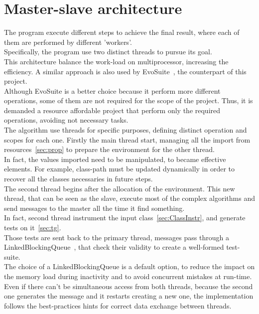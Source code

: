 \section{Master-slave architecture }\label{sec:MSArch}
The program execute different steps to achieve the final result, where each of them are performed by different 'workers'.\\
Specifically, the program use two distinct threads to pursue its goal.\\
This architecture balance the work-load on multiprocessor, increasing the efficiency.
A similar approach is also used by EvoSuite~\cite{evosuite}, the counterpart of this project.\\
Although EvoSuite is a better choice because it perform more different operations, some of them are not required for the scope of the project.
Thus, it is demanded a resource affordable project that perform only the required operations, avoiding not necessary tasks.\\
The algorithm use threads for specific purposes, defining distinct operation and scopes for each one.
Firstly the main thread start, managing all the import from resources~\ref{sec:prop} to prepare the environment for the other thread.\\
In fact, the values imported need to be manipulated, to became effective elements.
For example, class-path must be updated dynamically in order to recover all the classes necessaries in future steps.\\
The second thread begins after the allocation of the environment.
This new thread, that can be seen as the slave, execute most of the complex algorithms and send messages to the master all the time it find something.\\
In fact, second thread instrument the input class~\ref{sec:ClassInstr}, and generate tests on it~\ref{sec:tg}.\\
Those tests are sent back to the primary thread, messages pass through a LinkedBlockingQueue~\cite{linkedBlockingQueue}, that check their validity to create a well-formed test-suite.\\
The choice of a LinkedBlockingQueue is a default option, to reduce the impact on the memory load during inactivity and to avoid concurrent mistakes at run-time.\\
Even if there can't be simultaneous access from both threads, because the second one generates the message and it restarts creating a new one, the implementation follows the best-practices hints for correct data exchange between threads.